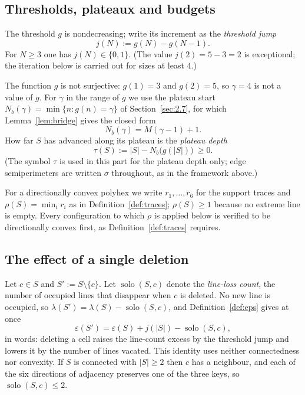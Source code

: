 \documentclass[11pt]{article}
\theoremstyle{plain}
\theoremstyle{definition}
\theoremstyle{remark}
\newcommand{\sm}{\setminus}
\DeclareMathOperator{\solo}{solo}
\begin{document}
\subsection{Thresholds, plateaux and budgets}\label{sec:9.3}

The threshold \(g\) is nondecreasing; write its increment as the \emph{threshold jump}
\[
   j(N):=g(N)-g(N-1).
\]
For \(N\ge3\) one has \(j(N)\in\{0,1\}\). (The value \(j(2)=5-3=2\) is exceptional; the
iteration below is carried out for sizes at least \(4\).)

The function \(g\) is not surjective: \(g(1)=3\) and \(g(2)=5\), so \(\gamma=4\) is not a
value of \(g\). For \(\gamma\) in the range of \(g\) we use the plateau start
\(N_{b}(\gamma)=\min\{n:g(n)=\gamma\}\) of Section~\ref{sec:2.7}, for which
Lemma~\ref{lem:bridge} gives the closed form
\begin{equation}\label{eq:nbform}
   N_{b}(\gamma)=M(\gamma-1)+1 .
\end{equation}
How far \(S\) has advanced along its plateau is the \emph{plateau depth}
\[
   \tau(S):=|S|-N_{b}\bigl(g(|S|)\bigr)\ \ge0 .
\]
(The symbol \(\tau\) is used in this part for the plateau depth only; edge semiperimeters
are written \(\sigma\) throughout, as in the framework above.)

For a directionally convex polyhex we write \(r_{1},\dots,r_{6}\) for the support traces
and \(\rho(S)=\min_{i}r_{i}\) as in Definition~\ref{def:traces}; \(\rho(S)\ge1\) because no
extreme line is empty. Every configuration to which \(\rho\) is applied below is verified
to be directionally convex first, as Definition~\ref{def:traces} requires.

\subsection{The effect of a single deletion}\label{sec:9.4}

Let \(c\in S\) and \(S':=S\sm\{c\}\). Let \(\solo(S,c)\) denote the \emph{line-loss count},
the number of occupied lines that disappear when \(c\) is deleted. No new line is occupied,
so \(\lambda(S')=\lambda(S)-\solo(S,c)\), and Definition~\ref{def:eps} gives at once
\begin{equation}\label{eq:delta1}
   \varepsilon(S')=\varepsilon(S)+j(|S|)-\solo(S,c),
\end{equation}
in words: deleting a cell raises the line-count excess by the threshold jump and lowers it
by the number of lines vacated. This identity uses neither connectedness nor convexity. If
\(S\) is connected with \(|S|\ge2\) then \(c\) has a neighbour, and each of the six
directions of adjacency preserves one of the three keys, so \(\solo(S,c)\le2\).
\end{document}
